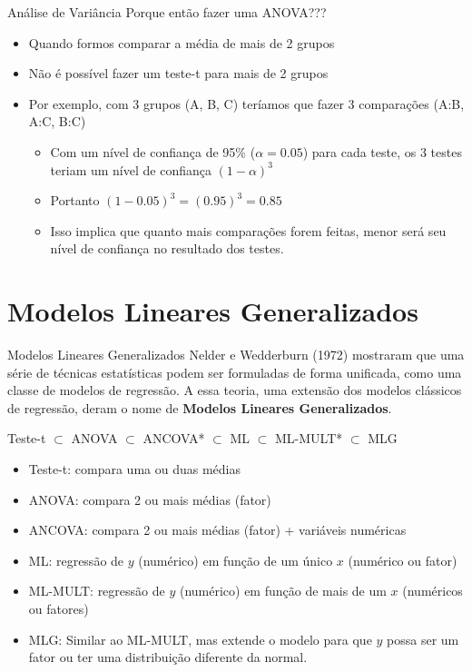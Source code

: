 \documentclass[10pt]{beamer}\usepackage{graphicx, color}
\begin{document}
\begin{frame}[fragile=singleslide]{Análise de Variância}
Porque então fazer uma ANOVA???
\begin{itemize}
\item Quando formos comparar a média de mais de 2 grupos
\item Não é possível fazer um teste-t para mais de 2 grupos
\item Por exemplo, com 3 grupos (A, B, C) teríamos que fazer 3
  comparações (A:B, A:C, B:C)
  \begin{itemize}
  \item Com um nível de confiança de 95\% ($\alpha = 0.05$)
    para cada teste, os 3 testes teriam um nível de confiança
    $(1-\alpha)^3$
  \item Portanto $(1-0.05)^3 = (0.95)^3 = 0.85$
  \item Isso implica que quanto mais comparações forem feitas, menor
    será seu nível de confiança no resultado dos testes.
  \end{itemize}
\end{itemize}
\end{frame}

\section[MLGs]{Modelos Lineares Generalizados}

\begin{frame}[fragile=singleslide]{Modelos Lineares Generalizados}
Nelder e Wedderburn (1972) mostraram que uma série de técnicas
estatísticas podem ser formuladas de forma unificada, como uma classe de
modelos de regressão. A essa teoria, uma extensão dos modelos clássicos
de regressão, deram o nome de \textbf{Modelos Lineares
  Generalizados}.
\begin{center}
  Teste-t $\subset$ ANOVA $\subset$ ANCOVA* $\subset$ ML $\subset$
  ML-MULT* $\subset$ MLG
\end{center}
  \begin{itemize}
  \item Teste-t: compara uma ou duas médias
  \item ANOVA: compara 2 ou mais médias (fator)
  \item ANCOVA: compara 2 ou mais médias (fator) + variáveis numéricas
  \item ML: regressão de $y$ (numérico) em função de um único $x$
    (numérico ou fator)
  \item ML-MULT: regressão de $y$ (numérico) em função de mais de um $x$
    (numéricos ou fatores)
  \item MLG: Similar ao ML-MULT, mas extende o modelo para que $y$ possa
    ser um fator ou ter uma distribuição diferente da normal.
  \end{itemize}
\end{frame}
\end{document}
